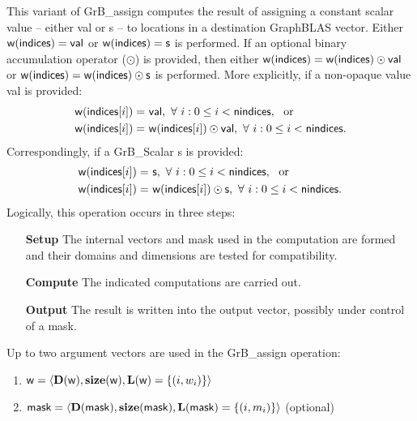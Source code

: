 {\color{red}
This variant of {\sf GrB\_assign} computes the result of assigning a constant
scalar value -- either {\sf val} or {\sf s} -- to locations in a destination GraphBLAS vector.
Either 
${\sf w}({\sf indices}) = {\sf val}$ or ${\sf w}({\sf indices}) = {\sf s}$ is performed.
If an optional binary accumulation 
operator ($\odot$) is provided, then either
${\sf w}({\sf indices}) = {\sf w}({\sf indices}) \odot {\sf val}$ or
${\sf w}({\sf indices}) = {\sf w}({\sf indices}) \odot {\sf s}$ is performed.  
More explicitly, if a non-opaque value {\sf val} is provided:
\[
\begin{aligned}
    {\sf w}({\sf indices}[i]) = &\ {\sf val}, \ 
    \forall \  i : 0 \leq i < {\sf nindices}, \mbox{~~or~~}
    \\
    {\sf w}({\sf indices}[i]) = &\ {\sf w}({\sf indices}[i]) \odot {\sf val}, \ 
    \forall \  i : 0 \leq i < {\sf nindices}.
\end{aligned}
\]
Correspondingly, if a {\sf GrB\_Scalar} {\sf s} is provided:
\[
\begin{aligned}
    {\sf w}({\sf indices}[i]) = &\ {\sf s}, \ 
    \forall \  i : 0 \leq i < {\sf nindices}, \mbox{~~or~~}
    \\
    {\sf w}({\sf indices}[i]) = &\ {\sf w}({\sf indices}[i]) \odot {\sf s}, \ 
    \forall \  i : 0 \leq i < {\sf nindices}.
\end{aligned}
\]
}
Logically, this operation occurs in three steps:
\begin{enumerate}[leftmargin=0.75in]
\item[\bf Setup] The internal vectors and mask used in the computation are formed 
and their domains and dimensions are tested for compatibility.
\item[\bf Compute] The indicated computations are carried out.
\item[\bf Output] The result is written into the output vector, possibly under 
control of a mask.
\end{enumerate}

Up to two argument vectors are used in the {\sf GrB\_assign} operation:
\begin{enumerate}
	\item ${\sf w} = \langle \bold{D}({\sf w}),\bold{size}({\sf w}),
    \bold{L}({\sf w}) = \{(i,w_i) \} \rangle$

	\item ${\sf mask} = \langle \bold{D}({\sf mask}),\bold{size}({\sf mask}),
    \bold{L}({\sf mask}) = \{(i,m_i) \} \rangle$ (optional)
\end{enumerate}

